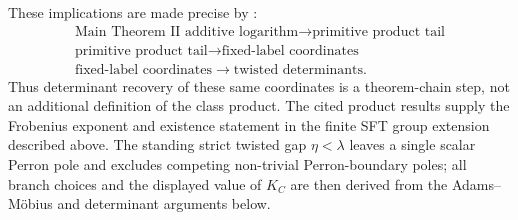 \documentclass[11pt,a4paper]{amsart}
\theoremstyle{plain}
\theoremstyle{definition}
\theoremstyle{remark}
\begin{document}
These implications are made precise by
:
\[
\begin{array}{c}
\text{Main Theorem II additive logarithm}\longrightarrow\text{primitive product tail}\\[2pt]
\text{primitive product tail}\longrightarrow\text{fixed-label coordinates}\\[2pt]
\text{fixed-label coordinates}\longrightarrow\text{twisted determinants}.
\end{array}
\]
Thus determinant recovery of these same coordinates is a theorem-chain step,
not an additional definition of the class product.  The cited product results
supply the Frobenius exponent and existence statement in the finite SFT group
extension described above.  The standing strict twisted gap \(\eta<\lambda\)
leaves a single scalar Perron pole and excludes competing non-trivial
Perron-boundary poles; all branch choices and the displayed value of \(K_C\) are
then derived from the Adams--M\"obius and determinant arguments below.
\end{document}
